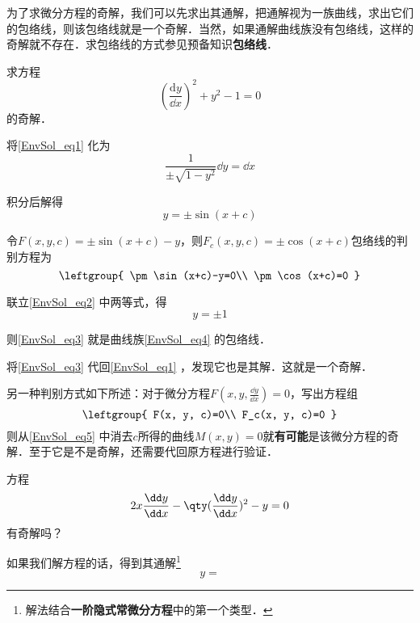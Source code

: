 为了求微分方程的奇解，我们可以先求出其通解，把通解视为一族曲线，求出它们的包络线，则该包络线就是一个奇解．当然，如果通解曲线族没有包络线，这样的奇解就不存在．求包络线的方式参见预备知识\textbf{包络线}．

\begin{example}{}
求方程
\begin{equation}\label{EnvSol_eq1}
(\frac{\mathrm{d} y}{\dd x})^2+y^2-1=0
\end{equation}
的奇解．

将\autoref{EnvSol_eq1} 化为
\begin{equation}
\frac{1}{\pm\sqrt{1-y^2}}\dd y=\dd x
\end{equation}

积分后解得
\begin{equation}\label{EnvSol_eq4}
y=\pm\sin(x+c)
\end{equation}

令$F(x, y, c)=\pm\sin(x+c)-y$，则$F_c(x, y, c)=\pm\cos(x+c)$包络线的判别方程为
\begin{equation}\label{EnvSol_eq2}
\leftgroup{
    \pm\sin(x+c)-y=0\\
    \pm\cos(x+c)=0
}
\end{equation}

联立\autoref{EnvSol_eq2} 中两等式，得
\begin{equation}\label{EnvSol_eq3}
y=\pm 1
\end{equation}

则\autoref{EnvSol_eq3} 就是曲线族\autoref{EnvSol_eq4} 的包络线．

将\autoref{EnvSol_eq3} 代回\autoref{EnvSol_eq1} ，发现它也是其解．这就是一个奇解．


\end{example}

另一种判别方式如下所述：对于微分方程$F(x, y, \frac{\dd y}{\dd x})=0$，写出方程组
\begin{equation}\label{EnvSol_eq5}
\leftgroup{
    F(x, y, c)=0\\
    F_c(x, y, c)=0
}
\end{equation}
则从\autoref{EnvSol_eq5} 中消去$c$所得的曲线$M(x, y)=0$就\textbf{有可能}是该微分方程的奇解．至于它是不是奇解，还需要代回原方程进行验证．

\begin{example}{}
方程
\begin{equation}
2x\frac{\dd y}{\dd x}-\qty(\frac{\dd y}{\dd x})^2-y=0
\end{equation}
有奇解吗？

如果我们解方程的话，得到其通解\footnote{解法结合\textbf{一阶隐式常微分方程}中的第一个类型．}
\begin{equation}
y=
\end{equation}

\end{example}
























